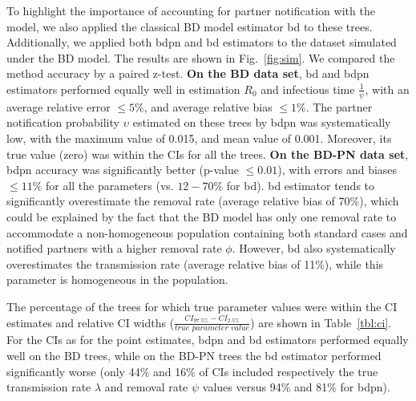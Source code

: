 \documentclass[10pt,letterpaper]{article}
\begin{document}
To highlight the importance of accounting for partner notification with the model, we also applied the classical BD model estimator bd to these trees. Additionally, we applied both bdpn and bd estimators to the dataset simulated under the BD model. The results are shown in  Fig.~\ref{fig:sim}.
We compared the method accuracy by a paired z-test. \textbf{On the BD data set}, bd and bdpn estimators performed equally well in estimation $R_0$ and infectious time $\frac{1}{\psi}$, with an average relative error $\leq 5\%$, and average relative bias $\leq 1\%$. The partner notification probability $\upsilon$ estimated on these trees by bdpn was systematically low, with the maximum value of 0.015, and mean value of 0.001. Moreover, its true value (zero) was within the CIs for all the trees. \textbf{On the BD-PN data set}, bdpn accuracy was significantly better (p-value $\leq 0.01$), with errors and biases $\leq 11\%$ for all the parameters (vs. $12-70\%$ for bd). bd estimator tends to significantly overestimate the removal rate (average relative bias of 70\%), which could be explained by the fact that the BD model has only one removal rate to accommodate a non-homogeneous population containing both standard cases and notified partners with a higher removal rate $\phi$.  However, bd also systematically overestimates the transmission rate (average relative bias of 11\%), while this parameter is homogeneous in the population.






The percentage of the trees for which true parameter values were within the CI estimates and relative CI widths ($\frac{CI_{97.5\%} - CI_{2.5\%}}{\textit{true parameter value}}$) are shown in Table~\ref{tbl:ci}. For the CIs as for the point estimates, bdpn and bd estimators performed equally well on the BD trees, while on the BD-PN trees the bd estimator performed significantly worse (only 44\% and 16\% of CIs included respectively the true transmission rate $\lambda$ and removal rate $\psi$ values versus 94\% and 81\% for bdpn).
\end{document}
